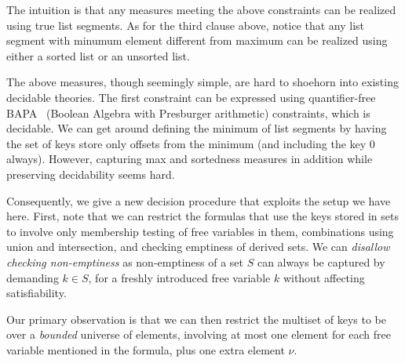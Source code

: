The intuition is that any measures meeting the above constraints can be realized using true list
segments. As for the third clause above, notice that any list segment with minumum element different
from maximum can be realized using either a sorted list or an unsorted list.

The above measures, though seemingly simple, are hard to shoehorn into existing decidable theories.
The first constraint can be expressed using quantifier-free BAPA~\cite{} (Boolean Algebra with Presburger
arithmetic) constraints, which is decidable. We can get around defining the minimum of list segments
by having the set of keys store only offsets from the minimum (and including the key $0$ always). However,
capturing max and sortedness measures in addition while preserving decidability seems hard.

Consequently, we give a new decision procedure that exploits the setup we have here.
First, note that we can restrict the formulas that use the keys stored in sets to involve
only membership testing of free variables in them, combinations using union and intersection,
and checking emptiness of derived sets. We can \emph{disallow checking non-emptiness} as non-emptiness
of a set $S$ can always be captured by demanding $k \in S$, for a freshly introduced free variable $k$
without affecting satisfiability.

Our primary observation is that we can then restrict the multiset of keys to be over a  \emph{bounded}
universe of elements, involving at most one element for each free variable mentioned in the formula,
plus one extra element $\nu$. 